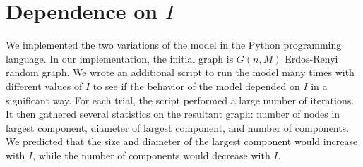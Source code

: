 \documentclass[a4paper,10pt]{article}
\begin{document}
\section{Dependence on $I$}

We implemented the two variations of the model in the Python programming language. In our implementation, the initial graph is $G(n, M)$ Erdos-Renyi random graph. We wrote an additional script to run the model many times with different values of $I$ to see if the behavior of the model depended on $I$ in a significant way. For each trial, the script performed a large number of iterations. It then gathered several statistics on the resultant graph: number of nodes in largest component, diameter of largest component, and number of components. We predicted that the size and diameter of the largest component would increase with $I$, while the number of components would decrease with $I$. 
\end{document}
